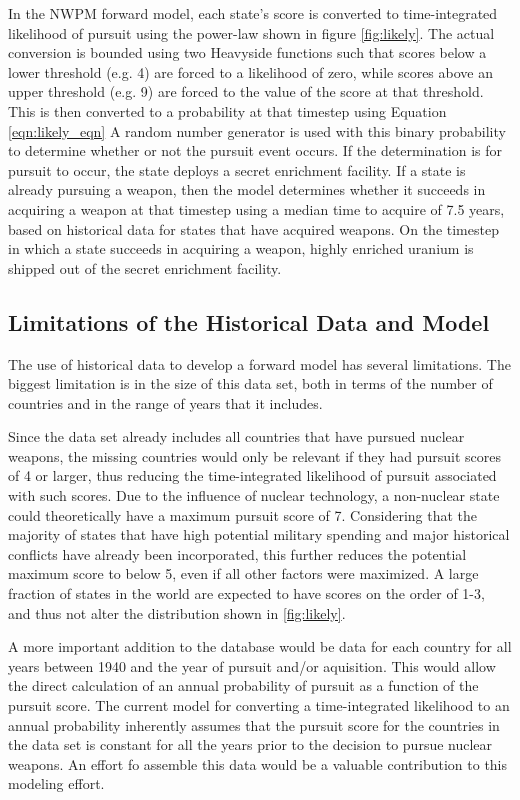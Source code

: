 In the \gls{NWPM} forward model, each state's score is converted to time-integrated likelihood of pursuit using the power-law shown in figure \ref{fig:likely}. The actual conversion is bounded using two Heavyside functions such that scores below a lower threshold (e.g. 4) are forced to a likelihood of zero, while scores above an upper threshold (e.g. 9) are forced to the value of the score at that threshold. This is then converted to a probability at that timestep using Equation \ref{eqn:likely_eqn}   A random number generator is used with this binary probability to determine whether or not the pursuit event occurs. If the determination is for pursuit to occur, the state deploys a secret enrichment facility. If a state is already pursuing a weapon, then the model determines whether it succeeds in acquiring a weapon at that timestep using a median time to acquire of 7.5 years, based on historical data for states that have acquired weapons. On the timestep in which a state succeeds in acquiring a weapon, highly enriched uranium is shipped out of the secret enrichment facility.

\subsection{Limitations of the Historical Data and Model}
The use of historical data to develop a forward model has several limitations. The biggest limitation is in the size of this data set, both in terms of the number of countries and in the range of years that it includes.

Since the data set already includes all countries that have pursued nuclear weapons, the missing countries would only be relevant if they had pursuit scores of 4 or larger, thus reducing the time-integrated likelihood of pursuit associated with such scores. Due to the influence of nuclear technology, a non-nuclear state could theoretically have a maximum pursuit score of 7. Considering that the majority of states that have high potential military spending and major historical conflicts have already been incorporated, this further reduces the potential maximum score to below 5, even if all other factors were maximized.  A large fraction of states in the world are expected to have scores on the order of 1-3, and thus not alter the distribution shown in \ref{fig:likely}.

A more important addition to the database would be data for each country for all years between
1940  and the year of pursuit and/or aquisition.  This would allow the direct calculation of an annual probability of pursuit as a function of the pursuit score.  The current model for converting a time-integrated likelihood to an annual probability inherently assumes that the pursuit score for the countries in the data set is constant for all the years prior to the decision to pursue nuclear weapons.  An effort fo assemble this data would be a valuable contribution to this modeling effort.


